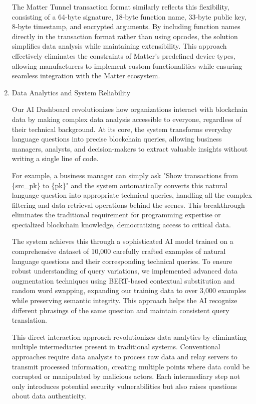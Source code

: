 \documentclass[conference]{IEEEtran}
\begin{document}
\begin{enumerate}[itemsep=2ex, parsep=1ex]
	      The Matter Tunnel transaction format similarly reflects this flexibility, consisting of a 64-byte signature, 18-byte function name, 33-byte public key, 8-byte timestamp, and encrypted arguments. By including function names directly in the transaction format rather than using opcodes, the solution simplifies data analysis while maintaining extensibility. This approach effectively eliminates the constraints of Matter's predefined device types, allowing manufacturers to implement custom functionalities while ensuring seamless integration with the Matter ecosystem.
	      	      	                  
	\item Data Analytics and System Reliability
	      	      	      
        Our AI Dashboard revolutionizes how organizations interact with blockchain data by making complex data analysis accessible to everyone, regardless of their technical background. At its core, the system transforms everyday language questions into precise blockchain queries, allowing business managers, analysts, and decision-makers to extract valuable insights without writing a single line of code.
        	                
        For example, a business manager can simply ask "Show transactions from \{src\_pk\} to \{pk\}" and the system automatically converts this natural language question into appropriate technical queries, handling all the complex filtering and data retrieval operations behind the scenes. This breakthrough eliminates the traditional requirement for programming expertise or specialized blockchain knowledge, democratizing access to critical data.
        	      
        The system achieves this through a sophisticated AI model trained on a comprehensive dataset of 10,000 carefully crafted examples of natural language questions and their corresponding technical queries. To ensure robust understanding of query variations, we implemented advanced data augmentation techniques using BERT-based contextual substitution and random word swapping, expanding our training data to over 3,000 examples while preserving semantic integrity. This approach helps the AI recognize different phrasings of the same question and maintain consistent query translation.
        	      
        This direct interaction approach revolutionizes data analytics by eliminating multiple intermediaries present in traditional systems. Conventional approaches require data analysts to process raw data and relay servers to transmit processed information, creating multiple points where data could be corrupted or manipulated by malicious actors. Each intermediary step not only introduces potential security vulnerabilities but also raises questions about data authenticity.
        	      

\end{enumerate}
\end{document}
